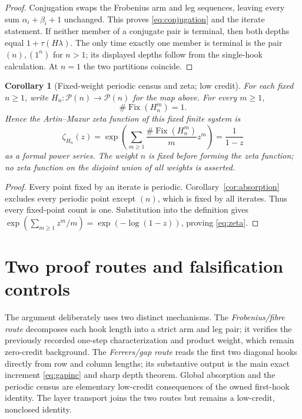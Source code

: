 \documentclass[10pt]{amsart}
\newtheorem{corollary}[theorem]{Corollary}
\theoremstyle{definition}
\newcommand{\Par}{\mathcal P}
\newcommand{\Fix}{\operatorname{Fix}}
\begin{document}
\begin{proof}
Conjugation swaps the Frobenius arm and leg sequences, leaving every sum
$\alpha_i+\beta_i+1$ unchanged.  This proves \eqref{eq:conjugation} and the
iterate statement.  If neither member of a conjugate pair is terminal, then
both depths equal $1+\tau(H\lambda)$.  The only time exactly one member is
terminal is the pair $(n),(1^n)$ for $n>1$; its displayed depths follow from
the single-hook calculation.  At $n=1$ the two partitions coincide.
\end{proof}

\begin{corollary}[Fixed-weight periodic census and zeta; low credit]
\label{cor:zeta}
For each fixed $n\geq1$, write $H_n:\Par(n)\to\Par(n)$ for the map above.
For every $m\geq1$,
\[
 \#\Fix(H_n^m)=1.
\]
Hence the Artin--Mazur zeta function of this fixed finite system is
\begin{equation}
 \label{eq:zeta}
 \zeta_{H_n}(z)
 =\exp\!\left(\sum_{m\geq1}\frac{\#\Fix(H_n^m)}m z^m\right)
 =\frac1{1-z}
\end{equation}
as a formal power series.  The weight $n$ is fixed before forming the zeta
function; no zeta function on the disjoint union of all weights is asserted.
\end{corollary}

\begin{proof}
Every point fixed by an iterate is periodic.  Corollary~\ref{cor:absorption}
excludes every periodic point except $(n)$, which is fixed by all iterates.
Thus every fixed-point count is one.  Substitution into the definition gives
$\exp(\sum_{m\geq1}z^m/m)=\exp(-\log(1-z))$, proving
\eqref{eq:zeta}.
\end{proof}

\section{Two proof routes and falsification controls}

The argument deliberately uses two distinct mechanisms.  The
\emph{Frobenius/fibre route} decomposes each hook length into a strict arm and
leg pair; it verifies the previously recorded one-step characterization and
product weight, which remain zero-credit background.  The
\emph{Ferrers/gap route} reads the first two diagonal hooks directly from row
and column lengths; its substantive output is the main exact increment
\eqref{eq:gapinc} and sharp depth theorem.  Global absorption and the periodic
census are elementary low-credit consequences of the owned first-hook
identity.  The layer transport joins the two routes but remains a low-credit,
nonclosed identity.
\end{document}

